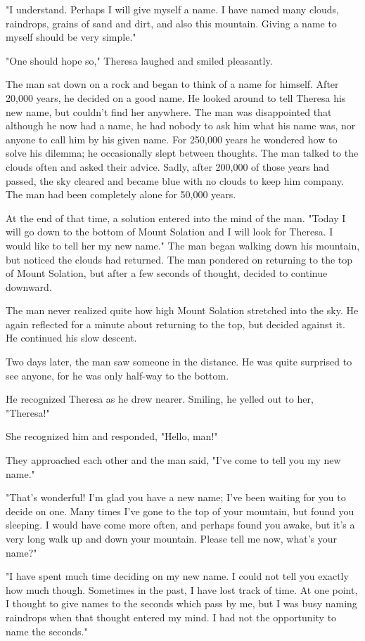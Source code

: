 "I understand. Perhaps I will give myself a name. I have named many clouds, raindrops, grains of sand and dirt, and also this mountain. Giving a name to myself should be very simple."

"One should hope so," Theresa laughed and smiled pleasantly.

The man sat down on a rock and began to think of a name for himself. After 20,000 years, he decided on a good name. He looked around to tell Theresa his new name, but couldn't find her anywhere. The man was disappointed that although he now had a name, he had nobody to ask him what his name was, nor anyone to call him by his given name. For 250,000 years he wondered how to solve his dilemma; he occasionally slept between thoughts. The man talked to the clouds often and asked their advice. Sadly, after 200,000 of those years had passed, the sky cleared and became blue with no clouds to keep him company. The man had been completely alone for 50,000 years.

At the end of that time, a solution entered into the mind of the man. "Today I will go down to the bottom of Mount Solation and I will look for Theresa. I would like to tell her my new name." The man began walking down his mountain, but noticed the clouds had returned. The man pondered on returning to the top of Mount Solation, but after a few seconds of thought, decided to continue downward.

The man never realized quite how high Mount Solation stretched into the sky. He again reflected for a minute about returning to the top, but decided against it. He continued his slow descent.

Two days later, the man saw someone in the distance. He was quite surprised to see anyone, for he was only half-way to the bottom.

He recognized Theresa as he drew nearer. Smiling, he yelled out to her, "Theresa!"

She recognized him and responded, "Hello, man!"

They approached each other and the man said, "I've come to tell you my new name."

"That's wonderful! I'm glad you have a new name; I've been waiting for you to decide on one. Many times I've gone to the top of your mountain, but found you sleeping. I would have come more often, and perhaps found you awake, but it's a very long walk up and down your mountain. Please tell me now, what's your name?"

"I have spent much time deciding on my new name. I could not tell you exactly how much though. Sometimes in the past, I have lost track of time. At one point, I thought to give names to the seconds which pass by me, but I was busy naming raindrops when that thought entered my mind. I had not the opportunity to name the seconds."


